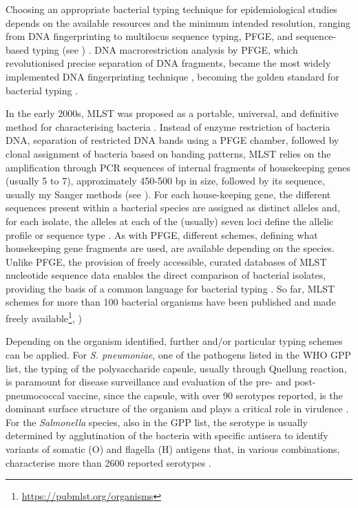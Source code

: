 Choosing an appropriate bacterial typing technique for epidemiological studies depends on the available resources and the minimum intended resolution, ranging from DNA fingerprinting to multilocus sequence typing, \ac{PFGE}, and sequence-based typing (see ) \citep{allerberger_molecular_2012,foxman_choosing_2005}. 
DNA macrorestriction analysis by \ac{PFGE}, which revolutionised precise separation of DNA fragments, became the most widely implemented DNA fingerprinting technique \citep{allerberger_molecular_2012}, becoming the golden standard for bacterial typing \citep{neoh_pulsed-field_2019}.

In the early 2000s, \ac{MLST} was proposed as a portable, universal, and definitive method for characterising bacteria \citep{maiden_multilocus_2006}. 
Instead of enzyme restriction of bacteria DNA, separation of restricted DNA bands using a \ac{PFGE} chamber, followed by clonal assignment of bacteria based on banding patterns, \ac{MLST} relies on the amplification through \ac{PCR} sequences of internal fragments of housekeeping genes (usually 5 to 7), approximately 450-500 \ac{bp} in size, followed by its sequence, usually my Sanger methods (see ). 
For each house-keeping gene, the different sequences present within a bacterial species are assigned as distinct alleles and, for each isolate, the alleles at each of the (usually) seven loci define the allelic profile or sequence type \citep{larsen_multilocus_2012}. 
As with \ac{PFGE}, different schemes, defining what housekeeping gene fragments are used, are available depending on the species. 
Unlike \ac{PFGE}, the provision of freely accessible, curated databases of \ac{MLST} nucleotide sequence data enables the direct comparison of bacterial isolates, providing the basis of a common language for bacterial typing \citep{maiden_multilocus_2006}. 
So far, \ac{MLST} schemes for more than 100 bacterial organisms have been published and made freely available\footnote{\url{https://pubmlst.org/organisms}}, \cite{jolley_open-access_2018}) 

Depending on the organism identified, further and/or particular typing schemes can be applied. 
For \textit{S. pneumoniae}, one of the pathogens listed in the \ac{WHO} \ac{GPP} list, the typing of the polysaccharide capsule, usually through Quellung reaction, is paramount for disease surveillance and evaluation of the pre- and post-pneumococcal vaccine, since the capsule, with over 90 serotypes reported, is the dominant surface structure of the organism and plays a critical role in virulence \citep{jauneikaite_current_2015, paton_streptococcus_2019}. 
For the \textit{Salmonella} species, also in the \ac{GPP} list, the serotype is usually determined by agglutination of the bacteria with specific antisera to identify variants of somatic (O) and flagella (H) antigens that, in various combinations, characterise more than 2600 reported serotypes \citep{diep_salmonella_2019}. 

